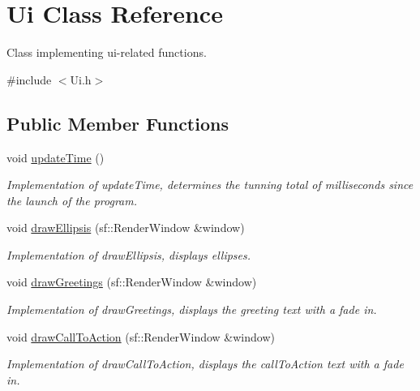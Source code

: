 \hypertarget{classUi}{}\section{Ui Class Reference}
\label{classUi}


Class implementing ui-\/related functions.  




{\ttfamily \#include $<$Ui.\+h$>$}

\subsection*{Public Member Functions}
\begin{DoxyCompactItemize}
\item 
\hypertarget{classUi_ae79ab4db2acb1f59fa8908728e84316b}{}\label{classUi_ae79ab4db2acb1f59fa8908728e84316b} 
void \hyperlink{classUi_ae79ab4db2acb1f59fa8908728e84316b}{update\+Time} ()
\begin{DoxyCompactList}\small\item\em Implementation of update\+Time, determines the tunning total of milliseconds since the launch of the program. \end{DoxyCompactList}\item 
\hypertarget{classUi_a5e3815dbf589f1a6f9fd12ee174569a8}{}\label{classUi_a5e3815dbf589f1a6f9fd12ee174569a8} 
void \hyperlink{classUi_a5e3815dbf589f1a6f9fd12ee174569a8}{draw\+Ellipsis} (sf\+::\+Render\+Window \&window)
\begin{DoxyCompactList}\small\item\em Implementation of draw\+Ellipsis, displays ellipses. \end{DoxyCompactList}\item 
\hypertarget{classUi_a32a4e1a089109be12b0b70a28402e4aa}{}\label{classUi_a32a4e1a089109be12b0b70a28402e4aa} 
void \hyperlink{classUi_a32a4e1a089109be12b0b70a28402e4aa}{draw\+Greetings} (sf\+::\+Render\+Window \&window)
\begin{DoxyCompactList}\small\item\em Implementation of draw\+Greetings, displays the greeting text with a fade in. \end{DoxyCompactList}\item 
\hypertarget{classUi_a2afb7682769928b3536905182524baa2}{}\label{classUi_a2afb7682769928b3536905182524baa2} 
void \hyperlink{classUi_a2afb7682769928b3536905182524baa2}{draw\+Call\+To\+Action} (sf\+::\+Render\+Window \&window)
\begin{DoxyCompactList}\small\item\em Implementation of draw\+Call\+To\+Action, displays the call\+To\+Action text with a fade in. \end{DoxyCompactList}\item 

\end{DoxyCompactItemize}
